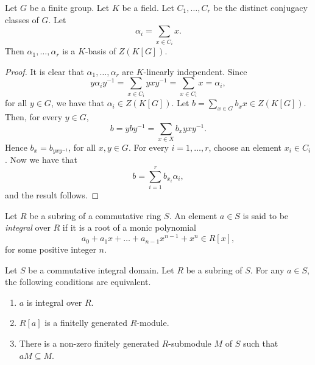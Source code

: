 \begin{lemma}\label{basiscenter}
    Let $G$ be a finite group. Let $K$ be a field. Let $C_1,\dots, C_r$ be the distinct conjugacy classes of $G$. Let
    \[ \alpha_i=\sum_{x\in C_i}x.\]    
    Then $\alpha_1,\dots ,\alpha_r$ is a $K$-basis of $Z(K[G])$.
\end{lemma}

\begin{proof}
    It is clear that $\alpha_1,\dots, \alpha_r$ are $K$-linearly independent. Since
    \[ y\alpha_i y^{-1}=\sum_{x\in C_i}yxy^{-1}=\sum_{x\in C_i}x=\alpha_i,\]
    for all $y\in G$, we have that $\alpha_i\in Z(K[G])$. Let $b=\sum_{x\in G}b_xx\in Z(K[G])$.
    Then, for every $y\in G$,
    \[ b=yby^{-1}=\sum_{x\in X}b_xyxy^{-1}.\]
    Hence $b_x=b_{yxy^{-1}}$, for all $x,y\in G$. For every $i=1,\dots ,r$, choose an element $x_i\in C_i$. Now we have that
    \[ b=\sum_{i=1}^rb_{x_i}\alpha_i,\]
    and the result follows.
\end{proof}

\begin{definition}
Let $R$ be a subring of a commutative ring $S$. An element $a\in S$ is said to be {\em integral} over $R$ if 
it is a root of a monic polynomial
\[ a_0+a_1x+\dots +a_{n-1}x^{n-1}+x^n\in R[x],\]
for some positive integer $n$.
\end{definition}

\begin{proposition}\label{integralelement}
Let $S$ be a commutative integral domain. Let $R$ be a subring of $S$. For any $a\in S$, the following conditions are equivalent.
\begin{enumerate}
    \item $a$ is integral over $R$.
    \item $R[a]$ is a finitelly generated $R$-module.
    \item There is a non-zero finitely generated $R$-submodule $M$ of $S$ such that $aM\subseteq M$.
\end{enumerate}
\end{proposition}

